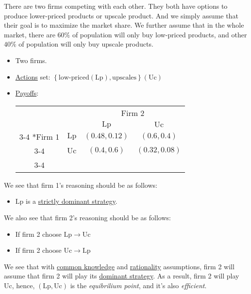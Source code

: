 \begin{eg}\label{eg:two-firms}
	There are two firms competing with each other. They both have options to produce lower-priced products or upscale product. And we simply assume that their goal is to maximize the market share. We further assume that in the whole market, there are \(60\%\) of population will only buy low-priced products, and other \(40\%\) of population will only buy upscale products.
	\begin{itemize}
		\item Two firms.
		\item \hyperref[def:strategy]{Actions} set: \(\left\{\text{low-priced} (\mathrm{Lp}), \text{upscales}\right\} (\mathrm{Uc} )\)
		\item \hyperref[def:reward]{Payoffs}:
		      \begin{table}[H]
			      \centering
			      \setlength{\extrarowheight}{2pt}
			      \begin{tabular}{cc|c|c|}
				                            & \multicolumn{1}{c}{} & \multicolumn{2}{c}{Firm 2}                                            \\
				                            & \multicolumn{1}{c}{} & \multicolumn{1}{c}{$\mathrm{Lp}$} & \multicolumn{1}{c}{$\mathrm{Uc}$} \\\cline{3-4}
				      \multirow{2}*{Firm 1} & $\mathrm{Lp}$        & $(0.48, 0.12)$                    & $(0.6, 0.4)$                      \\\cline{3-4}
				                            & $\mathrm{Uc}$        & $(0.4, 0.6)$                      & $(0.32, 0.08)$                    \\\cline{3-4}
			      \end{tabular}
		      \end{table}
	\end{itemize}
	We see that firm 1's reasoning should be as follows:
	\begin{itemize}
		\item \(\mathrm{Lp}\) is a \hyperref[def:dominant-strategy]{strictly dominant strategy}.
	\end{itemize}

	We also see that firm 2's reasoning should be as follows:
	\begin{itemize}
		\item If firm 2 choose \(\mathrm{Lp} \to \mathrm{Uc}\)
		\item If firm 2 choose \(\mathrm{Uc} \to \mathrm{Lp}\)
	\end{itemize}

	We see that with \hyperref[common-knowledge]{common knowledge} and \hyperref[rationality]{rationality} assumptions, firm 2 will assume that firm 2 will play its \hyperref[def:dominant-strategy]{dominant strategy}. As a result, firm 2 will play \(\mathrm{Uc}\), hence, \((\mathrm{Lp}, \mathrm{Uc})\) is the \emph{equibrilium point}, and it's also \emph{efficient}.
\end{eg}

